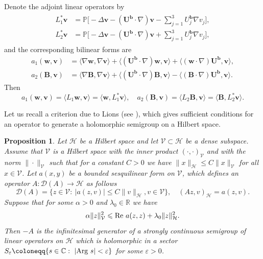 \documentclass[10pt]{amsart}
\theoremstyle{plain}
\newtheorem{proposition}[lemma]{Proposition}
\theoremstyle{definition}
\theoremstyle{remark}
\numberwithin{equation}{section}
\newcommand{\bb}{{\boldsymbol{b}}}
\newcommand{\bv}{{\boldsymbol{v}}}
\newcommand{\bU}{{\boldsymbol{U}}}
\newcommand{\bw}{{\boldsymbol{w}}}
\newcommand{\bB}{{\boldsymbol{B}}}
\newcommand{\ve}{\varepsilon}
\begin{document}
Denote the adjoint linear operators by
\begin{align}\label{eqn:adjlinoperator}
\begin{aligned}
L_1^*\bv &=\mathbb P \bigl[-\Delta \bv-(\bU^\bb\cdot \nabla)\bv-\sum_{j=1}^3 U_j^\bb \nabla v_j\bigr],\\
L_2^*\bv &=\mathbb P \bigl[-\Delta \bv-(\bU^\bb\cdot \nabla)\bv+\sum_{j=1}^3 U_j^\bb \nabla v_j\bigr],
\end{aligned}
\end{align}
and the corresponding bilinear forms are
\begin{equation}
\begin{aligned}
\label{eqn:bilinearform}
a_1(\bw,\bv)&=\langle \nabla \bw , \nabla \bv \rangle 
    + \langle (\bU^\bb \cdot \nabla) \bw , \bv \rangle 
    +\langle (\bw \cdot \nabla) \bU^\bb, \bv \rangle,\\ 
a_2(\bB,\bv)&=\langle \nabla \bB,\nabla \bv \rangle 
    + \langle (\bU^\bb \cdot \nabla) \bB , \bv \rangle 
    -\langle (\bB \cdot \nabla) \bU^\bb, \bv \rangle.    
\end{aligned}
\end{equation}
Then
\[
a_1(\bw,\bv)=\langle L_1 \bw,\bv \rangle =\langle  \bw, L_1^*\bv \rangle,\quad 
a_2(\bB,\bv)=\langle L_2 \bB,\bv \rangle =\langle  \bB, L_2^*\bv\rangle.
\]

Let us recall a criterion due to Lions (see \cite[Proposition 1.2, Remarque 1.1]{Lions61}), which gives sufficient conditions for an operator to generate a holomorphic semigroup on a Hilbert space.

\begin{proposition}\label{prop:Lions}
Let $\mathcal{H}$ be a Hilbert space and let $\mathcal{V}\subset \mathcal{H}$ be a dense subspace. Assume that $\mathcal{V}$ is a Hilbert space with the inner product $(\cdot , \cdot )_{\mathcal{V}}$ and with the norm $\| \cdot \|_{\mathcal{V}}$ such that for a constant $C>0$ we have $ \|x\|_{\mathcal{H}}\leqslant C\|x\|_{\mathcal{V}}$ for all $x\in \mathcal{V}$. Let $a(x,y)$ be a bounded sesquilinear form on $\mathcal{V}$, which defines an operator $A: \mathcal{D}(A)\rightarrow \mathcal{H}$ as follows
\begin{equation*}
   \mathcal{D}(A)=\{ z\in \mathcal{V} :\ |a(z,v)|\leqslant C \| v\|_{\mathcal{H}}, v\in \mathcal{V}\}, \quad (Az,v)_{\mathcal{H}}=a(z,v).
\end{equation*}
Suppose that for some $\alpha >0$ and $\lambda_0 \in \mathbb R$ we have 
\begin{equation}\label{eqn:Lions}
  \alpha \| z\|_{\mathcal{V}}^2\leqslant \text{\rm Re} \ a(z,z)+\lambda_0\|z\|_{\mathcal{H}}^2.
\end{equation}
Then $-A$ is the infinitesimal generator of a strongly continuous semigroup of linear operators on $\mathcal{H}$ which is holomorphic in a sector $S_\ve\coloneqq \{s\in \mathbb C: \ |\text{\rm Arg}\ s|<\ve\}$ for some $\ve >0$.
\end{proposition}
\end{document}
